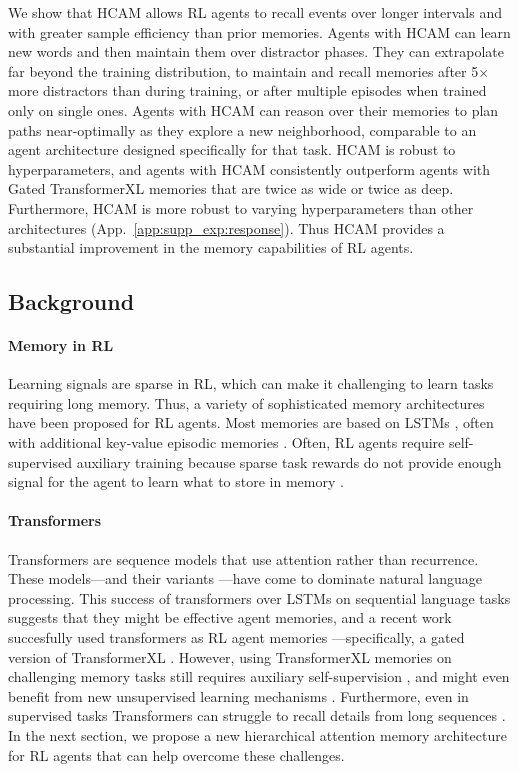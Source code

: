 \documentclass{article}
\begin{document}
We show that HCAM allows RL agents to recall events over longer intervals and with greater sample efficiency than prior memories. Agents with HCAM can learn new words and then maintain them over distractor phases. They can extrapolate far beyond the training distribution, to maintain and recall memories after 5\(\times\) more distractors than during training, or after multiple episodes when trained only on single ones. Agents with HCAM can reason over their memories to plan paths near-optimally as they explore a new neighborhood, comparable to an agent architecture designed specifically for that task. HCAM is robust to hyperparameters, and agents with HCAM consistently outperform agents with Gated TransformerXL memories \citep{parisotto2020stabilizing} that are twice as wide or twice as deep. Furthermore, HCAM is more robust to varying hyperparameters than other architectures (App.\ \ref{app:supp_exp:response}). Thus HCAM provides a substantial improvement in the memory capabilities of RL agents.

\subsection{Background}

\paragraph{Memory in RL} Learning signals are sparse in RL, which can make it challenging to learn tasks requiring long memory. Thus, a variety of sophisticated memory architectures have been proposed for RL agents. Most memories are based on LSTMs \citep{hochreiter1997long}, often with additional key-value episodic memories \citep{wayne2018unsupervised,fortunato2019generalization}. Often, RL agents require self-supervised auxiliary training because sparse task rewards do not provide enough signal for the agent to learn what to store in memory \citep{wayne2018unsupervised,fortunato2019generalization,hill2020grounded}.

\paragraph{Transformers} Transformers \citep{vaswani2017attention} are sequence models that use attention rather than recurrence. These models---and their variants \citep{dai2019transformer,kitaev2020reformer,wang2020linformer,press2021train}---have come to dominate natural language processing. This success of transformers over LSTMs on sequential language tasks suggests that they might be effective agent memories, and a recent work succesfully used transformers as RL agent memories \citep{parisotto2020stabilizing}---specifically, a gated version of TransformerXL \citep{dai2019transformer}. However, using TransformerXL memories on challenging memory tasks still requires auxiliary self-supervision \citep{hill2020grounded}, and might even benefit from new unsupervised learning mechanisms \citep{banino2021coberl}. Furthermore, even in supervised tasks Transformers can struggle to recall details from long sequences \citep{tay2021long}. In the next section, we propose a new hierarchical attention memory architecture for RL agents that can help overcome these challenges.
\end{document}
